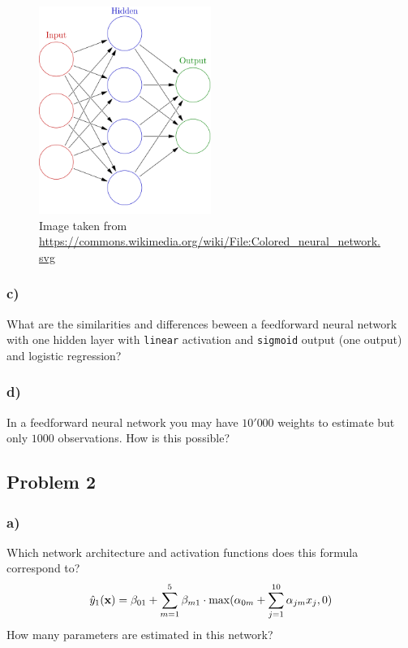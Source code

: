 \documentclass[]{article}
\begin{document}
\begin{figure}
\centering
\includegraphics[width=0.5\textwidth,height=\textheight]{Colorednn.png}
\caption{Image taken from
\url{https://commons.wikimedia.org/wiki/File:Colored_neural_network.svg}}
\end{figure}

\hypertarget{c}{%
\subsubsection{c)}\label{c}}

What are the similarities and differences beween a feedforward neural
network with one hidden layer with \texttt{linear} activation and
\texttt{sigmoid} output (one output) and logistic regression?

\hypertarget{d}{%
\subsubsection{d)}\label{d}}

In a feedforward neural network you may have \(10'000\) weights to
estimate but only \(1000\) observations. How is this possible?

\hypertarget{problem-2}{%
\subsection{Problem 2}\label{problem-2}}

\hypertarget{a-1}{%
\subsubsection{a)}\label{a-1}}

Which network architecture and activation functions does this formula
correspond to?
\[ \hat{y}_1({\bf x})=\beta_{01}+\sum_{m=1}^5 \beta_{m1}\cdot \max(\alpha_{0m}+\sum_{j=1}^{10} \alpha_{jm}x_j,0)\]
How many parameters are estimated in this network?
\end{document}
